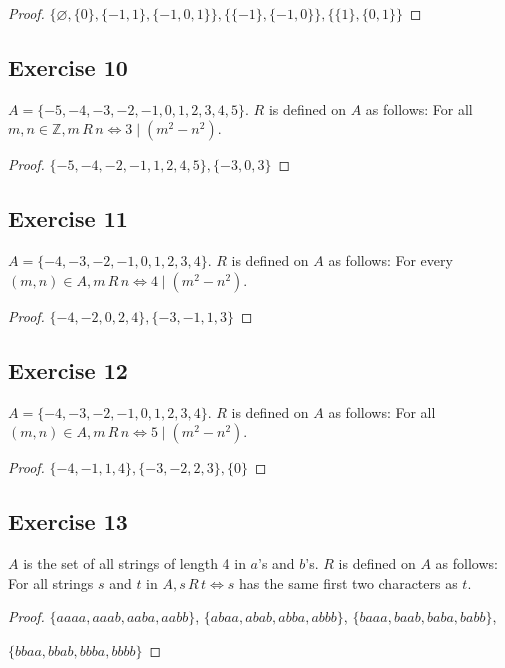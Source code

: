 \documentclass[14pt]{extarticle}
\newcommand{\es}{\varnothing}
\newcommand{\Z}{\mathbb{Z}}
\begin{document}
\begin{proof}
        \(\{\es, \{0\}, \{-1, 1\}, \{-1, 0, 1\}\}, \{\{-1\}, \{-1, 0\}\}, \{\{1\}, \{0, 1\}\}\)
\end{proof}

\subsection{Exercise 10}
\(A = \{-5, -4, -3, -2, -1, 0, 1, 2, 3, 4, 5\}\). \(R\) is defined on \(A\) as follows: For all \(m, n \in \Z,
m \,R\, n \iff 3 \mid (m^2 - n^2)\).

\begin{proof}
        \(\{-5, -4, -2, -1, 1, 2, 4, 5\}, \{-3, 0, 3\}\)
\end{proof}

\subsection{Exercise 11}
\(A = \{-4, -3, -2, -1, 0, 1, 2, 3, 4\}\). \(R\) is defined
on \(A\) as follows: For every \((m, n) \in A, m \,R\, n
\iff 4 \mid (m^2 - n^2)\).

\begin{proof}
        \(\{-4, -2, 0, 2, 4\}, \{-3, -1, 1, 3\}\)
\end{proof}

\subsection{Exercise 12}
\(A = \{-4, -3, -2, -1, 0, 1, 2, 3, 4\}\). \(R\) is defined on \(A\) as follows: For all \((m, n) \in A, m \,R\, n \iff
5 \mid (m^2 - n^2)\).

\begin{proof}
        \(\{-4, -1, 1, 4\}, \{-3, -2, 2, 3\}, \{0\}\)
\end{proof}

\subsection{Exercise 13}
\(A\) is the set of all strings of length 4 in \(a\)’s and \(b\)’s. \(R\) is defined on \(A\) as follows: For all
strings \(s\) and \(t\) in \(A, s \,R\, t \iff s\) has the same first two characters as \(t\).

\begin{proof}
        \(\{aaaa, aaab, aaba, aabb\}\), \(\{abaa, abab, abba, abbb\}\), \(\{baaa, baab, baba, babb\}\),

        \(\{bbaa, bbab, bbba, bbbb\}\)
\end{proof}
\end{document}
